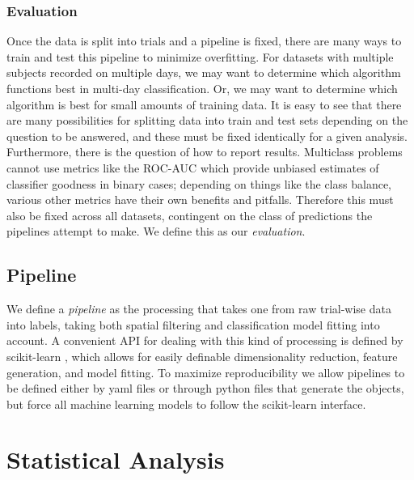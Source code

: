 \subsubsection{Evaluation}

Once the data is split into trials and a pipeline is fixed, there are many ways
to train and test this pipeline to minimize overfitting. For datasets with
multiple subjects recorded on multiple days, we may want to determine which
algorithm functions best in multi-day classification. Or, we may want to
determine which algorithm is best for small amounts of training data. It is easy
to see that there are many possibilities for splitting data into train and test
sets depending on the question to be answered, and these must be fixed
identically for a given analysis. Furthermore, there is the question of how to
report results. Multiclass problems cannot use metrics like the ROC-AUC which
provide unbiased estimates of classifier goodness in binary cases; depending on
things like the class balance, various other metrics have their own benefits and
pitfalls. Therefore this must also be fixed across all datasets, contingent on
the class of predictions the pipelines attempt to make. We define this as our
\emph{evaluation}.

\subsection{Pipeline}

We define a \emph{pipeline} as the processing that takes one from raw
trial-wise data into labels, taking both spatial filtering and
classification model fitting into account. A convenient API for
dealing with this kind of processing is defined by
scikit-learn \cite{Pedregosa2011}, which allows for easily definable
dimensionality reduction, feature generation, and model fitting. To
maximize reproducibility we allow pipelines to be defined either by
yaml files or through python files that generate the objects, but
force all machine learning models to follow the scikit-learn
interface. 

\section{Statistical Analysis}
\label{stats}

